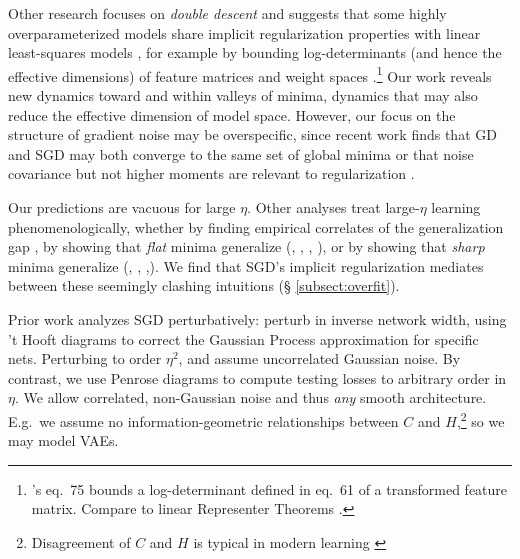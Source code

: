 \documentclass[anon,12pt]{colt2021} %
\begin{document}
            Other research focuses on \emph{double descent} and suggests that
            some highly overparameterized models share implicit regularization
            properties with linear least-squares models \citep{be19}, for
            example by bounding log-determinants (and hence the effective
            dimensions) of feature matrices and weight spaces
            \citep{me20}.\footnote{
                \cite{me20}'s eq.\ 75 bounds a log-determinant defined in eq.\
                61 of a transformed feature matrix.  Compare to linear
                Representer Theorems \citep{mo18b}.
            }
            Our work reveals new dynamics toward and within valleys of minima,
            dynamics that may also reduce the effective dimension of model space.
            However, our focus on the structure of gradient noise may be
            overspecific, since recent work finds that GD and SGD may both
            converge to the same set of global minima \citep{zo20} or that
            noise covariance but not higher moments are relevant to
            regularization \citep{wu20}. 

        
            Our predictions are vacuous for large $\eta$.  Other analyses treat
            large-$\eta$ learning phenomenologically, whether by finding
            empirical correlates of the generalization gap \citep{li18}, by
            showing that \emph{flat} minima generalize (\cite{ho17},
            \cite{ke17}, \cite{wa18}, \cite{zh19}), or by showing that
            \emph{sharp} minima generalize (\cite{st56}, \cite{di17},
            \cite{wu18},).  We find that SGD's implicit regularization mediates
            between these seemingly clashing intuitions (\S
            \ref{subsect:overfit}).
            
        
            Prior work analyzes SGD perturbatively: \cite{dy19} perturb in
            inverse network width, using 't Hooft diagrams to correct the
            Gaussian Process approximation for specific nets.  Perturbing
            to order $\eta^2$, \cite{ch18} and \cite{li17} assume uncorrelated
            Gaussian noise.  By contrast, we use Penrose diagrams \cite{pe71} to compute
            testing losses to arbitrary order in $\eta$.  We allow correlated,
            non-Gaussian noise and thus \emph{any} smooth architecture.  E.g.\
            we assume no information-geometric relationships between $C$ and
            $H$,\footnote{
                Disagreement of $C$ and
                $H$ is typical in modern learning \citep{ro12, ku19}
            } so we may model VAEs. 
\end{document}
